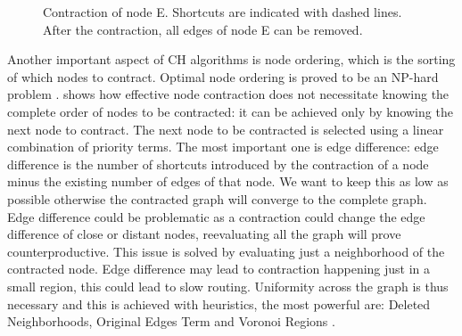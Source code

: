 \documentclass[12pt]{article}
\begin{document}
\begin{figure}

	\centering
	
	
		\caption{Contraction of node E. Shortcuts are indicated with dashed lines. After the contraction, all edges of node E can be removed.}
	\label{CH}
	\end{figure}
	

Another important aspect of CH algorithms is node ordering, which is the sorting of which nodes to contract. Optimal node ordering is proved to be an NP-hard problem \parencite{calamoneri_preprocessing_2010}. \cite{mcgeoch_contraction_2008} shows how effective node contraction does not necessitate knowing the complete order of nodes to be contracted: it can be achieved only by knowing the next node to contract. The next node to be contracted is selected using a linear combination of priority terms. The most important one is edge difference: edge difference is the number of shortcuts introduced by the contraction of a node minus the existing number of edges of that node. We want to keep this as low as possible otherwise the contracted graph will converge to the complete graph. Edge difference could be problematic as a contraction could change the edge difference of close or distant nodes, reevaluating all the graph will prove counterproductive. This issue is solved by evaluating just a neighborhood of the contracted node. Edge difference may lead to contraction happening just in a small region, this could lead to slow routing. Uniformity across the graph is thus necessary and this is achieved with heuristics, the most powerful are: Deleted Neighborhoods, Original Edges Term and Voronoi Regions \parencite{Geisberger2012}.
\end{document}
